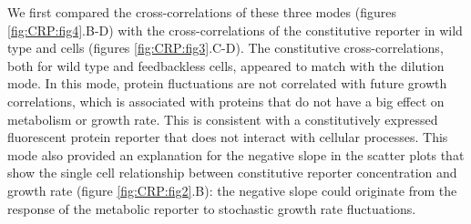 We first compared the cross-correlations of these three modes (figures \ref{fig:CRP:fig4}.B-D) with 
the cross-correlations of the constitutive reporter 
in wild type and \dcamp cells (figures \ref{fig:CRP:fig3}.C-D).
%
%
The constitutive cross-correlations, both for wild type and feedbackless cells, appeared to match with the dilution mode.
In this mode, protein fluctuations are not correlated with future growth correlations, 
%
which is associated with proteins that do not have a big effect on metabolism or growth rate.
This is consistent with a constitutively expressed fluorescent protein reporter that does not interact with cellular processes. 
%
This mode also provided an explanation for the negative slope in the scatter plots that show the single cell relationship 
between constitutive reporter concentration 
and growth rate (figure \ref{fig:CRP:fig2}.B): 
the negative slope could originate from the response of the metabolic reporter to stochastic growth rate fluctuations.




